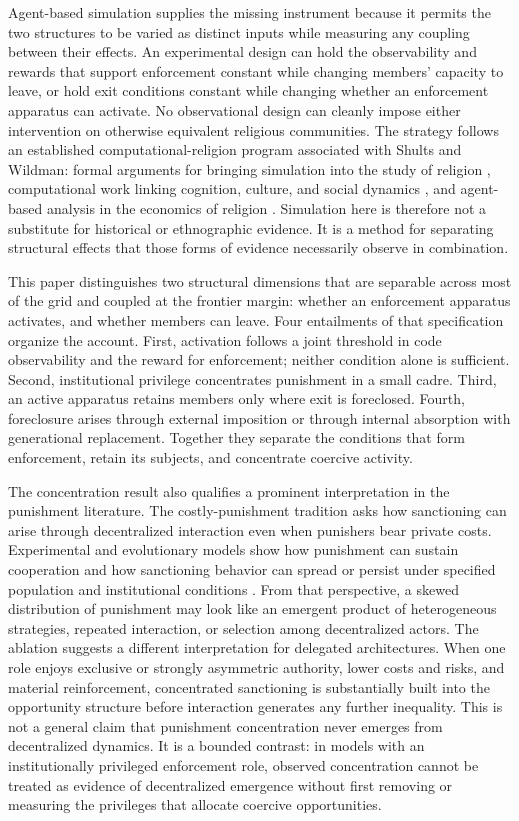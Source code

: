 \documentclass[12pt]{article}
\begin{document}
Agent-based simulation supplies the missing instrument because it permits the two structures to be varied as distinct inputs while measuring any coupling between their effects. An experimental design can hold the observability and rewards that support enforcement constant while changing members' capacity to leave, or hold exit conditions constant while changing whether an enforcement apparatus can activate. No observational design can cleanly impose either intervention on otherwise equivalent religious communities. The strategy follows an established computational-religion program associated with Shults and Wildman: formal arguments for bringing simulation into the study of religion \citep{wildmansosis2011}, computational work linking cognition, culture, and social dynamics \citep{gorelemosshultswildman2018}, and agent-based analysis in the economics of religion \citep{iannacconemakowsky2007}. Simulation here is therefore not a substitute for historical or ethnographic evidence. It is a method for separating structural effects that those forms of evidence necessarily observe in combination.

This paper distinguishes two structural dimensions that are separable across most of the grid and coupled at the frontier margin: whether an enforcement apparatus activates, and whether members can leave. Four entailments of that specification organize the account. First, activation follows a joint threshold in code observability and the reward for enforcement; neither condition alone is sufficient. Second, institutional privilege concentrates punishment in a small cadre. Third, an active apparatus retains members only where exit is foreclosed. Fourth, foreclosure arises through external imposition or through internal absorption with generational replacement. Together they separate the conditions that form enforcement, retain its subjects, and concentrate coercive activity.

The concentration result also qualifies a prominent interpretation in the punishment literature. The costly-punishment tradition asks how sanctioning can arise through decentralized interaction even when punishers bear private costs. Experimental and evolutionary models show how punishment can sustain cooperation and how sanctioning behavior can spread or persist under specified population and institutional conditions \citep{fehrgachter2000,boydgintisbowles2010,hauertetal2007}. From that perspective, a skewed distribution of punishment may look like an emergent product of heterogeneous strategies, repeated interaction, or selection among decentralized actors. The ablation suggests a different interpretation for delegated architectures. When one role enjoys exclusive or strongly asymmetric authority, lower costs and risks, and material reinforcement, concentrated sanctioning is substantially built into the opportunity structure before interaction generates any further inequality. This is not a general claim that punishment concentration never emerges from decentralized dynamics. It is a bounded contrast: in models with an institutionally privileged enforcement role, observed concentration cannot be treated as evidence of decentralized emergence without first removing or measuring the privileges that allocate coercive opportunities.
\end{document}
